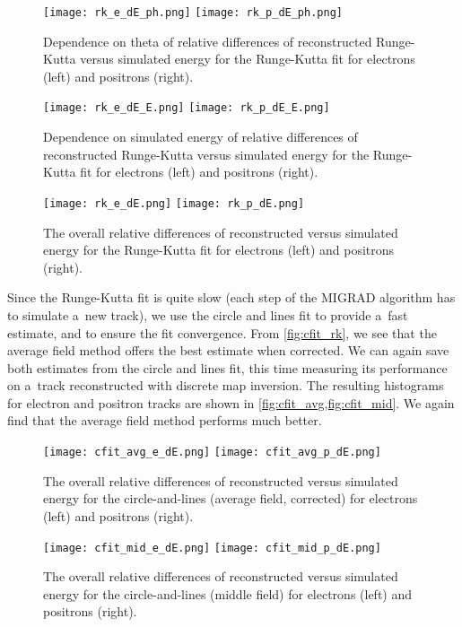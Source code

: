 			\begin{figure}
				\centering
				\texttt{[image: rk\_e\_dE\_ph.png]}
				\hfill
				\texttt{[image: rk\_p\_dE\_ph.png]}
				\caption{Dependence on theta of relative differences of reconstructed Runge-Kutta versus simulated energy for the Runge-Kutta fit for electrons (left) and positrons (right).}
				\label{fig:rk_dE_phi}
			\end{figure}

			\begin{figure}
				\centering
				\texttt{[image: rk\_e\_dE\_E.png]}
				\hfill
				\texttt{[image: rk\_p\_dE\_E.png]}
				\caption{Dependence on simulated energy of relative differences of reconstructed Runge-Kutta versus simulated energy for the Runge-Kutta fit for electrons (left) and positrons (right).}
				\label{fig:rk_dE_energy}
			\end{figure}

			\begin{figure}
				\centering
				\texttt{[image: rk\_e\_dE.png]}
				\hfill
				\texttt{[image: rk\_p\_dE.png]}
				\caption{The overall relative differences of reconstructed versus simulated energy for the Runge-Kutta fit for electrons (left) and positrons (right).}
				\label{fig:rk_dE}
			\end{figure}
			
			Since the Runge-Kutta fit is quite slow (each step of the MIGRAD algorithm has to simulate a~new track), we use the circle and lines fit to provide a~fast estimate, and to ensure the fit convergence. From \cref{fig:cfit_rk}, we see that the average field method offers the best estimate when corrected. We can again save both estimates from the circle and lines fit, this time measuring its performance on a~track reconstructed with discrete map inversion. The resulting histograms for electron and positron tracks are shown in \cref{fig:cfit_avg,fig:cfit_mid}. We again find that the average field method performs much better.
			
			\begin{figure}
				\centering
				\texttt{[image: cfit\_avg\_e\_dE.png]}
				\hfill
				\texttt{[image: cfit\_avg\_p\_dE.png]}
				\caption{The overall relative differences of reconstructed versus simulated energy for the circle-and-lines (average field, corrected) for electrons (left) and positrons (right).}
				\label{fig:cfit_avg}
			\end{figure}
			
			\begin{figure}
				\centering
				\texttt{[image: cfit\_mid\_e\_dE.png]}
				\hfill
				\texttt{[image: cfit\_mid\_p\_dE.png]}
				\caption{The overall relative differences of reconstructed versus simulated energy for the circle-and-lines (middle field) for electrons (left) and positrons (right).}
				\label{fig:cfit_mid}
			\end{figure}